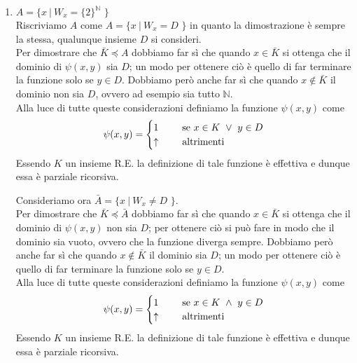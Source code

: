 \documentclass[a4paper,oneside,titlepage]{book}
\begin{document}
\begin{enumerate}[label=\fbox{\arabic*}]
\item $A = \text{\{ } x \ | \ W_x = \{2\}^{\mathbb{N}} \text{ \}}$
\\ Riscriviamo $A$ come $A = \text{\{ } x \ | \ W_x = D \text{ \}}$ in quanto la dimostrazione è sempre la stessa, qualunque insieme $D$ si consideri.
\\ Per dimostrare che $\bar{K} \preceq A$ dobbiamo far sì che quando $x \in \bar{K}$ si ottenga che il dominio di $\psi(x,y)$ sia $D$; un modo per ottenere ciò è quello di far terminare la funzione solo se $y \in D$. Dobbiamo però anche far sì che quando $x \notin \bar{K}$ il dominio non sia $D$, ovvero ad esempio sia tutto $\mathbb{N}$.
\\ Alla luce di tutte queste considerazioni definiamo la funzione $\psi(x,y)$ come
\[
\psi(x,y) =
\begin{cases}
1& \hspace{0.5cm} \text{se } x \in K \ \vee \ y \in D \\
\uparrow& \hspace{0.5cm} \text{altrimenti}
\end{cases}
\]
Essendo $K$ un insieme R.E. la definizione di tale funzione è effettiva e dunque essa è parziale ricorsiva.

Consideriamo ora $\bar{A} = \text{\{ } x \ | \ W_x \neq D \text{ \}}$.
\\ Per dimostrare che $\bar{K} \preceq \bar{A}$ dobbiamo far sì che quando $x \in \bar{K}$ si ottenga che il dominio di $\psi(x,y)$ non sia $D$; per ottenere ciò si può fare in modo che il dominio sia vuoto, ovvero che la funzione diverga sempre. Dobbiamo però anche far sì che quando $x \notin \bar{K}$ il dominio sia $D$; un modo per ottenere ciò è quello di far terminare la funzione solo se $y \in D$.
\\ Alla luce di tutte queste considerazioni definiamo la funzione $\psi(x,y)$ come
\[
\psi(x,y) =
\begin{cases}
1& \hspace{0.5cm} \text{se } x \in K \ \wedge \ y \in D \\
\uparrow& \hspace{0.5cm} \text{altrimenti}
\end{cases}
\]
Essendo $K$ un insieme R.E. la definizione di tale funzione è effettiva e dunque essa è parziale ricorsiva.


\end{enumerate}
\end{document}
